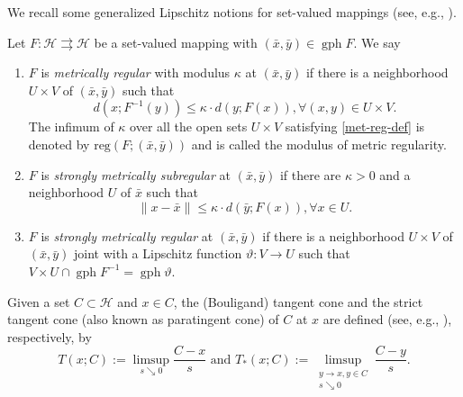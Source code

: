 \documentclass[smallextended,envcountsect,envcountsame]{svjour3}
\renewcommand{\H}{\mathcal{H}}
\newcommand{\tto}{\rightrightarrows}
\newcommand{\gph}{\operatorname{gph}}
\newcommand{\1}{\mathds{1}}
\begin{document}
	We recall some generalized Lipschitz notions for set-valued mappings (see, e.g., \cite{MR4769808}). 
    \begin{definition}
        Let $F\colon \H\tto \H$ be a set-valued mapping with $(\bar x,\bar y)\in \gph F$. We say
	\begin{enumerate}
		\item [1)] $F$ is \emph{metrically regular} with modulus $\kappa$ at $(\bar x,\bar y)$ if there is a neighborhood $U\times V$ of $(\bar x,\bar y)$ such that
		\begin{equation}\label{met-reg-def}
			d(x;F^{-1}(y))\leq \kappa\cdot d(y;F(x)), \forall (x,y)\in U\times V.
		\end{equation}
		The infimum of $\kappa$ over all the open sets $U\times V$ satisfying \eqref{met-reg-def} is denoted by $\text{reg}(F;(\bar x,\bar y))$ and is called the modulus of metric regularity.
		\item [2)] $F$ is \emph{strongly metrically subregular} at $(\bar x,\bar y)$ if there are $\kappa>0$ and  a neighborhood $U$ of $\bar x$ such that $$ \|x-\bar x\|\leq \kappa\cdot d(\bar y;F(x)), \forall x\in U. $$
		\item [3)] $F$ is \emph{strongly metrically regular} at $(\bar x,\bar y)$ if there is a neighborhood $U\times V$ of $(\bar x,\bar y)$ joint with a Lipschitz function $\vartheta\colon V\to U$ such that $V\times U\cap \gph F^{-1} = \gph \vartheta$. 
	\end{enumerate}
    \end{definition}
	Given a set $C\subset \H$ and $x\in C$, the (Bouligand) tangent cone and the strict tangent cone (also known as paratingent cone) of $C$ at $x$ are defined (see, e.g., \cite{MR2458436}), respectively, by
	\begin{equation*}
	    \displaystyle T(x;C) := \limsup_{s\searrow 0} \frac{C - x}{s} \text{ and }
		\displaystyle T_\ast(x;C) := \limsup_{\substack{y\to x, y\in C\\ s\searrow 0
        }}\frac{C-y}{s}.
	\end{equation*}
	
\end{document}
